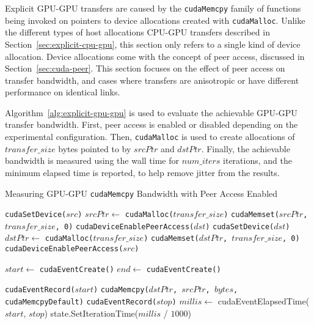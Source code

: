 Explicit GPU-GPU transfers are caused by the \texttt{cudaMemcpy} family of functions being invoked on pointers to device allocations created with \texttt{cudaMalloc}.
Unlike the different types of host allocations CPU-GPU transfers described in Section~\ref{sec:explicit-cpu-gpu}, this section only refers to a single kind of device allocation.
Device allocations come with the concept of peer access, discussed in Section~\ref{sec:cuda-peer}.
This section focuses on the effect of peer access on transfer bandwidth, and cases where transfers are anisotropic or have different performance on identical links.

Algorithm~\ref{alg:explicit-gpu-gpu} is used to evaluate the achievable GPU-GPU transfer bandwidth.
First, peer access is enabled or disabled depending on the experimental configuration.
Then, \texttt{cudaMalloc} is used to create allocations of $transfer\_size$ bytes pointed to by $srcPtr$ and $dstPtr$.
Finally, the achievable bandwidth is measured using the wall time for $num\_iters$ iterations, and the minimum elapsed time is reported, to help remove jitter from the results.


\begin{algorithm}[H]
	\caption[Measuring GPU-GPU \texttt{cudaMemcpy} Peer Bandwidth]{Measuring GPU-GPU \texttt{cudaMemcpy} Bandwidth with Peer Access Enabled}
	\label{alg:explicit-gpu-gpu}
	\begin{algorithmic}[1]
		\Statex
		\State \texttt{cudaSetDevice($src$)}
		\State $srcPtr \gets$ \texttt{cudaMalloc($transfer\_size$)} 
		\State \texttt{cudaMemset($srcPtr$, $transfer\_size$, 0)}
		\State \texttt{cudaDeviceEnablePeerAccess($dst$)}
		\State \texttt{cudaSetDevice($dst$)}
		\State $dstPtr \gets$ \texttt{cudaMalloc($transfer\_size$)} 
		\State \texttt{cudaMemset($dstPtr$, $transfer\_size$, 0)}
		\State \texttt{cudaDeviceEnablePeerAccess($src$)}
		
		\State $start \gets$ \texttt{cudaEventCreate()}
		\State $end \gets$ \texttt{cudaEventCreate()}

		\State \texttt{cudaEventRecord($start$)}
		\State \texttt{cudaMemcpy($dstPtr$, $srcPtr$, $bytes$, cudaMemcpyDefault)}
		\State \texttt{cudaEventRecord($stop$)}
		\State $millis \gets$ cudaEventElapsedTime($start$, $stop$)
		\State state.SetIterationTime($millis$ / $1000$)
        \EndFor
		
		\EndFunction
		
	\end{algorithmic}
\end{algorithm}

